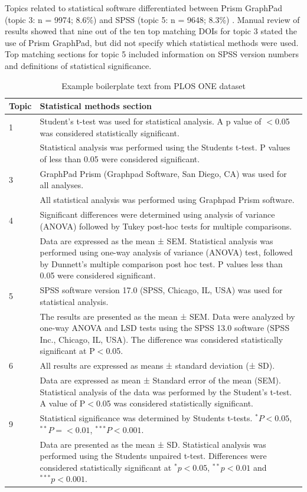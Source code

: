 \documentclass[12pt]{article}
\begin{document}
Topics related to statistical software differentiated between Prism
GraphPad (topic 3: n = 9974; 8.6\%) and SPSS (topic 5: n = 9648; 8.3\%)
. Manual review of results showed that nine out of the ten top matching
DOIs for topic 3 stated the use of Prism GraphPad, but did not specify
which statistical methods were used. Top matching sections for topic 5
included information on SPSS version numbers and definitions of
statistical significance.

\begin{landscape}
\begin{table}[]
\centering
\caption{Example boilerplate text from PLOS ONE dataset}
\label{tab:plos-example-boilerplate}
\begin{tabular}{p{0.1\linewidth} p{0.9\linewidth}}
\hline
\textbf{Topic} & \textbf{Statistical methods section} \\ \hline
1 & Student’s t-test was used for statistical analysis. A p value of $<$0.05 was considered statistically significant. \\
& Statistical analysis was performed using the Students t-test. P values of less than 0.05 were considered significant.\\
\hline
3 & GraphPad Prism (Graphpad Software, San Diego, CA) was used for all analyses.\\
 & All statistical analysis was performed using Graphpad Prism software.\\
 \hline
4 & Significant differences were determined using analysis of variance (ANOVA) followed by Tukey post-hoc tests for multiple comparisons.\\
& Data are expressed as the mean ± SEM. Statistical analysis was performed using one-way analysis of variance (ANOVA) test, followed by Dunnett’s multiple comparison post hoc test. P values less than 0.05 were considered significant.\\
\hline
5 & SPSS software version 17.0 (SPSS, Chicago, IL, USA) was used for statistical analysis.\\
  & The results are presented as the mean ± SEM. Data were analyzed by one-way ANOVA and LSD tests using the SPSS 13.0 software (SPSS Inc., Chicago, IL, USA). The difference was considered statistically significant at P$<$0.05.\\
  \hline
6 & All results are expressed as means ± standard deviation (± SD).\\
& Data are expressed as mean ± Standard error of the mean (SEM). Statistical analysis of the data was performed by the Student’s t-test. A value of P$<$0.05 was considered statistically significant.\\
\hline
9 & Statistical significance was determined by Students t-tests. $^{*} P<0.05$, $^{**} P = <0.01$, $^{***} P<0.001$.\\
 & Data are presented as the mean ± SD. Statistical analysis was performed using the Students unpaired t-test. Differences were considered statistically significant at $^{*}p<0.05$, $^{**}p<0.01$ and $^{***}p<0.001$.\\
 \hline
\end{tabular}
\end{table}
\end{landscape}
\end{document}
